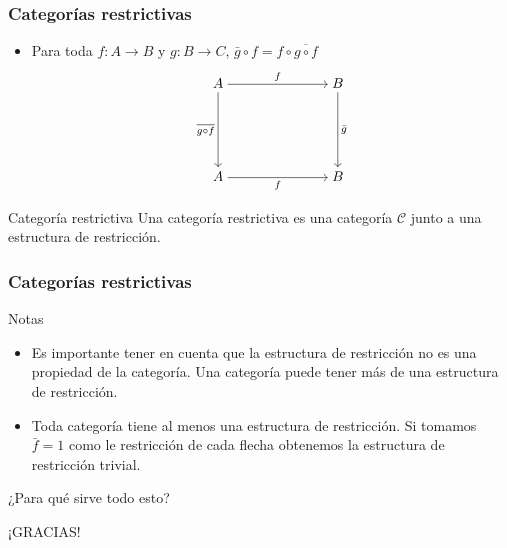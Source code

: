 \documentclass[10pt, aspectratio = 43,usenames,dvipsnames]{beamer}
\begin{document}
	\begin{frame}[t]
		\frametitle{Categorías restrictivas}
		\begin{itemize}
			\item Para toda $f:A\to B$ y $g:B\to C$, $\bar{g}\circ f = f\circ\overline{g\circ f}$
			\[\begin{tikzcd}[ampersand replacement=\&,cramped]
				A \&\&\& B \\
				\\
				\\
				A \&\&\& B
				\arrow["f", from=1-1, to=1-4]
				\arrow["{\overline{g\circ f}}"', from=1-1, to=4-1]
				\arrow["{\bar{g}}", from=1-4, to=4-4]
				\arrow["{f}"', from=4-1, to=4-4]
			\end{tikzcd}\]
		\end{itemize}
		
		\begin{block}{Categoría restrictiva}
			Una categoría restrictiva es una categoría $\mathcal{C}$ junto a una estructura de restricción.
		\end{block}
	\end{frame}

	\begin{frame}[t]
		\frametitle{Categorías restrictivas}
		\begin{block}{Notas}
			\begin{itemize}
				\item Es importante tener en cuenta que la estructura de restricción no es una propiedad de la categoría. Una categoría puede tener más de una estructura de restricción.
				
				\item Toda categoría tiene al menos una estructura de restricción. Si tomamos $\bar{f} = 1$ como le restricción de cada flecha obtenemos la estructura de restricción trivial.
			\end{itemize}
		\end{block}
	\end{frame}
	
	\begin{frame}
		\begin{center}
			\LARGE ¿Para qué sirve todo esto?
		\end{center}
	\end{frame}
	
	\begin{frame}
		\begin{center}
			\huge¡GRACIAS!
		\end{center}
	\end{frame}
	
\end{document}
